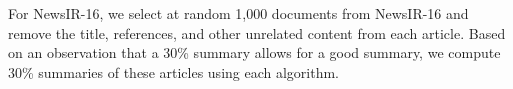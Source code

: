 \documentclass[a4paper,twoside]{article}
\begin{document}
For NewsIR-16, we select at random 1,000 documents from NewsIR-16 and remove the title, references, and other unrelated content from each article.
Based on an observation that a 30\% summary allows for a good summary,
we compute 30\% summaries of these articles using each algorithm.
%

\end{document}
